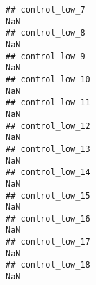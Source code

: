 \documentclass[
]{article}
\begin{document}
\begin{verbatim}
## control_low_7                                                                                                                                                                                                                 NaN
## control_low_8                                                                                                                                                                                                                 NaN
## control_low_9                                                                                                                                                                                                                 NaN
## control_low_10                                                                                                                                                                                                                NaN
## control_low_11                                                                                                                                                                                                                NaN
## control_low_12                                                                                                                                                                                                                NaN
## control_low_13                                                                                                                                                                                                                NaN
## control_low_14                                                                                                                                                                                                                NaN
## control_low_15                                                                                                                                                                                                                NaN
## control_low_16                                                                                                                                                                                                                NaN
## control_low_17                                                                                                                                                                                                                NaN
## control_low_18                                                                                                                                                                                                                NaN

\end{verbatim}
\end{document}
